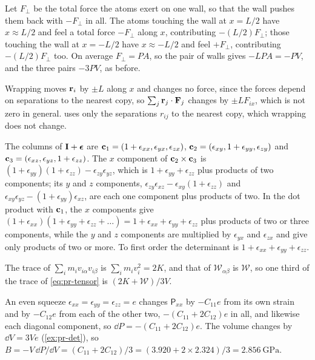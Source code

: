 Let $F_\perp$ be the total force the atoms exert
on one wall, so that the wall pushes them back with $-F_\perp$ in all. The
atoms touching the wall at $x = L/2$ have $x \approx L/2$ and feel a
total force $-F_\perp$ along $x$, contributing $-(L/2)F_\perp$; those
touching the wall at $x = -L/2$ have $x \approx -L/2$ and feel $+F_\perp$,
contributing $-(L/2)F_\perp$ too. On average $F_\perp = PA$, so the pair
of walls gives $-LPA = -PV$, and the three pairs $-3PV$, as before.

Wrapping moves $\bm{\mathrm{r}}_i$ by $\pm L$ along $x$ and
changes no force, since the forces depend on separations to the nearest
copy, so $\sum_j\bm{\mathrm{r}}_j\cdot\bm{\mathrm{F}}_j$ changes by $\pm LF_{ix}$, which is
not zero in general.  uses only the separations
$r_{ij}$ to the nearest copy, which wrapping does not change.

The columns of $\bm{\mathrm{I}} + \boldsymbol{\epsilon}$ are
$\bm{\mathrm{c}}_1 = (1 + \epsilon_{xx}, \epsilon_{yx}, \epsilon_{zx})$, $\bm{\mathrm{c}}_2 =
(\epsilon_{xy}, 1 + \epsilon_{yy}, \epsilon_{zy})$ and $\bm{\mathrm{c}}_3 =
(\epsilon_{xz}, \epsilon_{yz}, 1 + \epsilon_{zz})$. The $x$ component of
$\bm{\mathrm{c}}_2\times\bm{\mathrm{c}}_3$ is $(1 + \epsilon_{yy})(1 + \epsilon_{zz}) -
\epsilon_{zy}\epsilon_{yz}$, which is $1 + \epsilon_{yy} + \epsilon_{zz}$
plus products of two components; its $y$ and $z$ components,
$\epsilon_{zy}\epsilon_{xz} - \epsilon_{xy}(1 + \epsilon_{zz})$ and
$\epsilon_{xy}\epsilon_{yz} - (1 + \epsilon_{yy})\epsilon_{xz}$, are each
one component plus products of two. In the dot product with $\bm{\mathrm{c}}_1$,
the $x$ components give $(1 + \epsilon_{xx})(1 + \epsilon_{yy} +
\epsilon_{zz} + \dots) = 1 + \epsilon_{xx} + \epsilon_{yy} + \epsilon_{zz}$
plus products of two or three components, while the $y$ and $z$ components
are multiplied by $\epsilon_{yx}$ and $\epsilon_{zx}$ and give only
products of two or more. To first order the determinant is $1 +
\epsilon_{xx} + \epsilon_{yy} + \epsilon_{zz}$.

The trace of $\sum_im_iv_{i\alpha}v_{i\beta}$ is
$\sum_im_iv_i^2 = 2K$, and that of $\mathcal{W}_{\alpha\beta}$ is
$\mathcal{W}$, so one third of the trace of \cref{eq:pr-tensor} is $(2K +
\mathcal{W})/3V$.

An even squeeze $\epsilon_{xx} = \epsilon_{yy} =
\epsilon_{zz} = e$ changes $\mathsf{P}_{xx}$ by $-C_{11}e$ from its own
strain and by $-C_{12}e$ from each of the other two, $-(C_{11} +
2C_{12})e$ in all, and likewise each diagonal component, so $\dd P =
-(C_{11} + 2C_{12})e$. The volume changes by $\dd V = 3Ve$
(\cref{ex:pr-det}), so $B = -V\,\dd P/\dd V = (C_{11} + 2C_{12})/3 = (3.920
+ 2\times2.324)/3 = \SI{2.856}{\giga\pascal}$.

